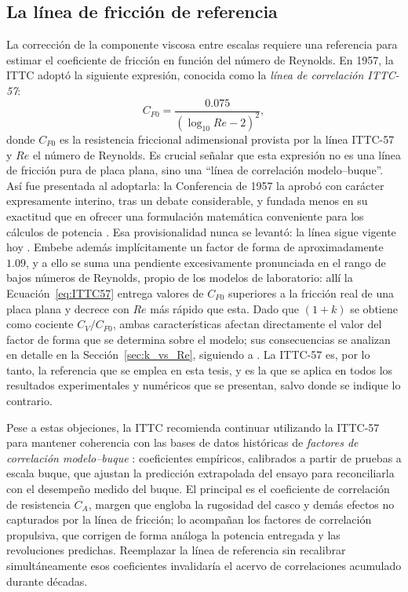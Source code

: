 \subsection{La línea de fricción de referencia}
\label{sec:ITTC57}

La corrección de la componente viscosa entre escalas requiere una referencia para estimar el coeficiente de fricción en función del número de Reynolds. En 1957, la ITTC adoptó la siguiente expresión, conocida como la \emph{línea de correlación ITTC-57}:
%
\begin{equation} \label{eq:ITTC57}
    C_{F0} = \frac{0.075}{(\log_{10} Re - 2)^2},
\end{equation}
%
donde $C_{F0}$ es la resistencia friccional adimensional provista por la línea
ITTC-57 y $Re$ el número de Reynolds. Es crucial señalar que esta expresión no
es una línea de fricción pura de placa plana, sino una ``línea de correlación
modelo--buque''. Así fue presentada al adoptarla: la Conferencia de 1957 la
aprobó con carácter expresamente interino, tras un debate considerable, y
fundada menos en su exactitud que en ofrecer una formulación matemática
conveniente para los cálculos de potencia \citep{ITTC1957}. Esa provisionalidad
nunca se levantó: la línea sigue vigente hoy \citep{ITTC_Performance_prediction}.
Embebe además implícitamente un factor de forma de aproximadamente $1.09$, y a
ello se suma una pendiente excesivamente pronunciada en el rango de bajos números de Reynolds, propio de los modelos de
laboratorio: allí la Ecuación~\eqref{eq:ITTC57} entrega valores de $C_{F0}$
superiores a la fricción real de una placa plana y decrece con $Re$ más rápido
que esta. Dado que $(1+k)$ se obtiene como cociente $C_V/C_{F0}$, ambas
características afectan directamente el valor del factor de forma que se
determina sobre el modelo; sus consecuencias se analizan en detalle en la
Sección~\ref{sec:k_vs_Re}, siguiendo a \citet{korkmaz_cfd_2021}. La ITTC-57 es, por lo tanto, la referencia que se emplea en esta tesis, y es
la que se aplica en todos los resultados experimentales y numéricos que se
presentan, salvo donde se indique lo contrario.

Pese a estas objeciones, la ITTC recomienda continuar utilizando la ITTC-57 para
mantener coherencia con las bases de datos históricas de \emph{factores de
correlación modelo--buque} \citep{ITTC_Combined_2021}: coeficientes empíricos,
calibrados a partir de pruebas a escala buque, que ajustan la predicción
extrapolada del ensayo para reconciliarla con el desempeño medido del buque. El
principal es el coeficiente de correlación de resistencia $C_A$, margen que
engloba la rugosidad del casco y demás efectos no capturados por la línea de
fricción; lo acompañan los factores de correlación propulsiva, que corrigen de
forma análoga la potencia entregada y las revoluciones predichas. Reemplazar la
línea de referencia sin recalibrar simultáneamente esos coeficientes
invalidaría el acervo de correlaciones acumulado durante décadas.

